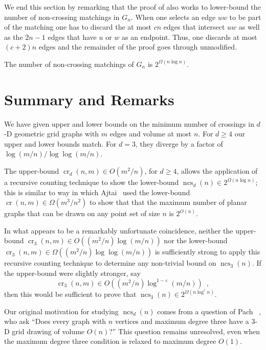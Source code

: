 \documentclass{patmorin}
\DeclareMathOperator{\crs}{cr}
\DeclareMathOperator{\ncs}{ncs}
\begin{document}
We end this section by remarking that the proof of 
also works to lower-bound the number of non-crossing matchings in $G_n$.
When one selects an edge $uw$ to be part of the matching one has to
discard the at most $cn$ edges that intersect $uw$ as well as the $2n-1$
edges that have $u$ or $w$ as an endpoint.  Thus, one discards at most
$(c+2)n$ edges and the remainder of the proof goes through unmodified.

\begin{cor}
  The number of non-crossing matchings of $G_n$ is $2^{\Omega(n\log n)}$.
\end{cor}


\section{Summary and Remarks}

We have given upper and lower bounds on the minimum number of crossings
in $d$-D geometric grid graphs with $m$ edges and volume at most $n$.
For $d\ge 4$ our upper and lower bounds match.  For $d=3$, they diverge
by a factor of $\log(m/n)/\log\log(m/n)$.

The upper-bound $\crs_d(n,m)\in O(m^2/n)$, for $d\ge 4$, allows the
application of a recursive counting technique to show the lower-bound
$\ncs_d(n)\in 2^{\Omega(n\log n)}$; this is similar to way in which Ajtai
\etal\ used the lower-bound $\crs(n,m)\in\Omega(m^3/n^2)$ to show that
that the maximum number of planar graphs that can be drawn on any point
set of size $n$ is $2^{O(n)}$.

In what appears to be a remarkably unfortunate coincidence, neither the
upper-bound $\crs_3(n,m)\in O((m^2/n)\log (m/n))$ nor the lower-bound
$\crs_3(n,m)\in \Omega((m^2/n)\log\log(m/n))$ is sufficiently strong
to apply this recursive counting technique to determine any non-trivial
bound on $\ncs_3(n)$.  If the upper-bound were slightly stronger, say
\[
   \crs_3(n,m)\in O((m^2/n)\log^{1-\varepsilon}(m/n)) \enspace ,
\]
then this would be sufficient to prove that
$\ncs_3(n)\in2^{\Omega(n\log^{\epsilon} n)}$.

Our original motivation for studying $\ncs_d(n)$  comes from a question
of Pach \etal~\cite{pach.thiele.ea:three-dimensional}, who ask ``Does
every graph with $n$ vertices and maximum degree three have a 3-D grid
drawing of volume $O(n)$?''  This question remains unresolved, even when
the maximum degree three condition is relaxed to maximum degree $O(1)$.
\end{document}

